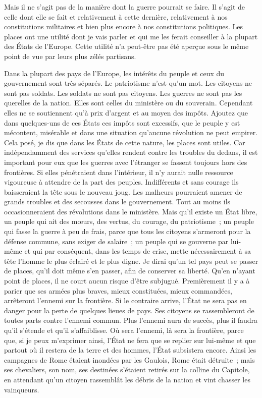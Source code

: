 \documentclass[french,twoside]{book} %
\begin{document}
Mais il ne s’agit pas de la manière dont la guerre pourrait se faire. Il s’agit de celle dont elle se fait et relativement à cette dernière, relativement à nos constitutions militaires et bien plus encore à nos constitutions politiques. Les places ont une utilité dont je vais parler et qui me les ferait conseiller à la plupart des États de l’Europe. Cette utilité n’a peut-être pas été aperçue sous le même point de vue par leurs plus zélés partisans.\par
Dans la plupart des pays de l’Europe, les intérêts du peuple et ceux du gouvernement sont très séparés. Le patriotisme n’est qu’un mot. Les citoyens ne sont pas soldats. Les soldats ne sont pas citoyens. Les guerres ne sont pas les querelles de la nation. Elles sont celles du ministère ou du souverain. Cependant elles ne se soutiennent qu’à prix d’argent et au moyen des impôts. Ajoutez que dans quelques-uns de ces États ces impôts sont excessifs, que le peuple y est mécontent, misérable et dans une situation qu’aucune révolution ne peut empirer. Cela posé, je dis que dans les États de cette nature, les places sont utiles. Car indépendamment des services qu’elles rendent contre les troubles du dedans, il est important pour eux que les guerres avec l’étranger se fassent toujours hors des frontières. Si elles pénétraient dans l’intérieur, il n’y aurait nulle ressource vigoureuse à attendre de la part des peuples. Indifférents et sans courage ils baisseraient la tête sous le nouveau joug. Les malheurs pourraient amener de grands troubles et des secousses dans le gouvernement. Tout au moins ils occasionneraient des révolutions dans le ministère. Mais qu’il existe un État libre, un peuple qui ait des mœurs, des vertus, du courage, du patriotisme ; un peuple qui fasse la guerre à peu de frais, parce que tous les citoyens s’armeront pour la défense commune, sans exiger de salaire ; un peuple qui se gouverne par lui-même et qui par conséquent, dans les temps de crise, mette nécessairement à sa tête l’homme le plus éclairé et le plus digne. Je dirai qu’un tel pays peut se passer de places, qu’il doit même s’en passer, afin de conserver sa liberté. Qu’en n’ayant point de places, il ne court aucun risque d’être subjugué. Premièrement il y a à parier que ses armées plus braves, mieux constituées, mieux commandées, arrêteront l’ennemi sur la frontière. Si le contraire arrive, l’État ne sera pas en danger pour la perte de quelques lieues de pays. Ses citoyens se rassembleront de toutes parts contre l’ennemi commun. Plus l’ennemi aura de succès, plus il faudra qu’il s’étende et qu’il s’affaiblisse. Où sera l’ennemi, là sera la frontière, parce que, si je peux m’exprimer ainsi, l’État ne fera que se replier sur lui-même et que partout où il restera de la terre et des hommes, l’État subsistera encore. Ainsi les campagnes de Rome étaient inondées par les Gaulois, Rome était détruite ; mais ses chevaliers, son nom, ses destinées s’étaient retirés sur la colline du Capitole, en attendant qu’un citoyen rassemblât les débris de la nation et vint chasser les vainqueurs.\par
\end{document}
